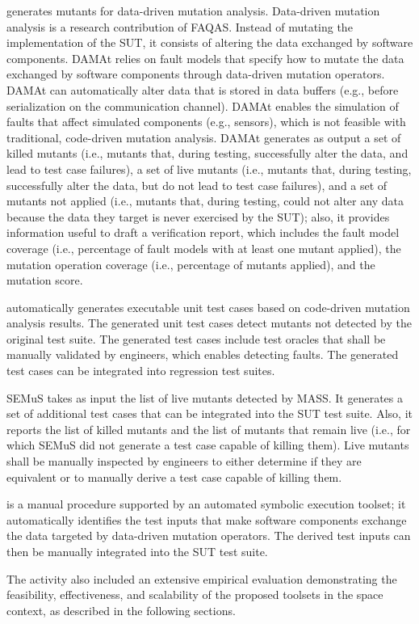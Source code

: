  generates mutants for data-driven mutation analysis. Data-driven mutation analysis is a research contribution of FAQAS. Instead of mutating the implementation of the SUT, it consists of altering the data exchanged by software components.
DAMAt relies on fault models that specify how to mutate the data exchanged by software components through data-driven mutation operators. DAMAt can automatically alter data that is stored in data buffers (e.g., before serialization on the communication channel).
DAMAt enables the simulation of faults that affect simulated components (e.g., sensors), which is not feasible with traditional, code-driven mutation analysis.
DAMAt generates as output a set of killed mutants (i.e., mutants that, during testing, successfully alter the data, and lead to test case failures), a set of live mutants (i.e., mutants that, during testing, successfully alter the data, but do not lead to test case failures), and a set of mutants not applied (i.e., mutants that, during testing, could not alter any data because the data they target is never exercised by the SUT); also, it provides information useful to draft a verification report, which includes the fault model coverage (i.e., percentage of fault models with at least one mutant applied), the mutation operation coverage (i.e., percentage of mutants applied), and the mutation score.

 automatically generates executable unit test cases based on code-driven mutation analysis results. The generated unit test cases detect mutants not detected by the original test suite. The generated test cases include test oracles that shall be manually validated by engineers, which enables detecting faults. The generated test cases can be integrated into regression test suites.

SEMuS takes as input the list of live mutants detected by MASS. It generates a set of additional test cases that can be integrated into the SUT test suite. Also, it reports the list of killed mutants and the list of mutants that remain live (i.e., for which SEMuS did not generate a test case capable of killing them). Live mutants shall be manually inspected by engineers to either determine if they are equivalent or to manually derive a test case capable of killing them.

 is a manual procedure supported by an automated symbolic execution toolset; it automatically identifies the test inputs that make software components exchange the data targeted by data-driven mutation operators. The derived test inputs can then be manually integrated into the SUT test suite.

The activity also included an extensive empirical evaluation demonstrating the feasibility, effectiveness, and scalability of the proposed toolsets in the space context, as described in the following sections.
